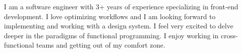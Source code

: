 

\begin{cvparagraph}

I am a software engineer with 3+ years of experience specializing in front-end development. I love optimizing workflows and I am looking forward to implementing and working with a design system. I feel very excited to delve deeper in the paradigms of functional programming. I enjoy working in cross-functional teams and getting out of my comfort zone.
\end{cvparagraph}

